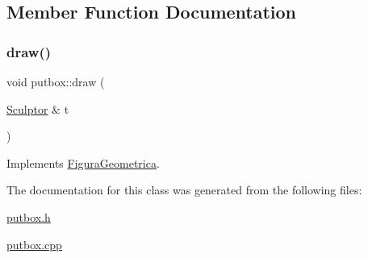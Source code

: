 \subsection{Member Function Documentation}
\mbox{\label{classputbox_a1c330a31b906efd7b0fcfa0efb6f06ef}} 
\subsubsection{\texorpdfstring{draw()}{draw()}}
{\footnotesize\ttfamily void putbox\+::draw (\begin{DoxyParamCaption}\item[{\mbox{\hyperlink{class_sculptor}{Sculptor}} \&}]{t }\end{DoxyParamCaption})\hspace{0.3cm}{\ttfamily [virtual]}}



Implements \mbox{\hyperlink{class_figura_geometrica_a34585fd7c0bd7378fc69c4ee208e676c}{Figura\+Geometrica}}.



The documentation for this class was generated from the following files\+:\begin{DoxyCompactItemize}
\item 
\mbox{\hyperlink{putbox_8h}{putbox.\+h}}\item 
\mbox{\hyperlink{putbox_8cpp}{putbox.\+cpp}}\end{DoxyCompactItemize}
